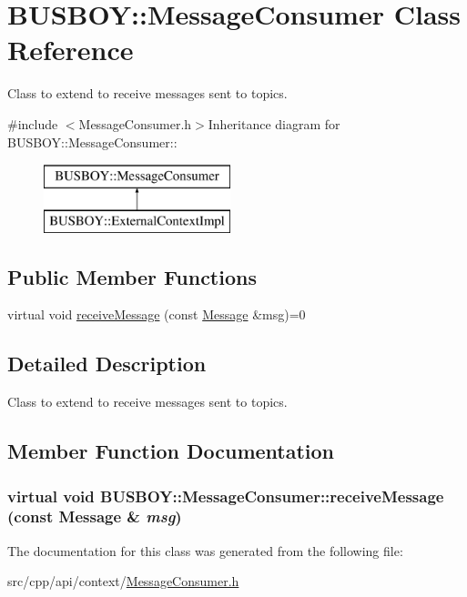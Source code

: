 \hypertarget{classBUSBOY_1_1MessageConsumer}{
\section{BUSBOY::MessageConsumer Class Reference}
\label{classBUSBOY_1_1MessageConsumer}
}


Class to extend to receive messages sent to topics.  


{\ttfamily \#include $<$MessageConsumer.h$>$}Inheritance diagram for BUSBOY::MessageConsumer::\begin{figure}[H]
\begin{center}
\leavevmode
\includegraphics[height=2cm]{classBUSBOY_1_1MessageConsumer}
\end{center}
\end{figure}
\subsection*{Public Member Functions}
\begin{DoxyCompactItemize}
\item 
virtual void \hyperlink{classBUSBOY_1_1MessageConsumer_a6b736d139df086853811dc298beb3f0d}{receiveMessage} (const \hyperlink{classBUSBOY_1_1Message}{Message} \&msg)=0
\end{DoxyCompactItemize}


\subsection{Detailed Description}
Class to extend to receive messages sent to topics. 

\subsection{Member Function Documentation}
\hypertarget{classBUSBOY_1_1MessageConsumer_a6b736d139df086853811dc298beb3f0d}{
\subsubsection[{receiveMessage}]{\setlength{\rightskip}{0pt plus 5cm}virtual void BUSBOY::MessageConsumer::receiveMessage (const {\bf Message} \& {\em msg})}}
\label{classBUSBOY_1_1MessageConsumer_a6b736d139df086853811dc298beb3f0d}


The documentation for this class was generated from the following file:\begin{DoxyCompactItemize}
\item 
src/cpp/api/context/\hyperlink{MessageConsumer_8h}{MessageConsumer.h}\end{DoxyCompactItemize}
